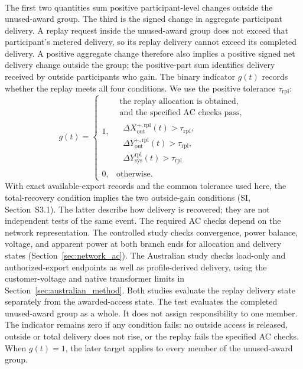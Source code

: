 \documentclass[twoside,twocolumn,9pt]{article}
\begin{document}
{\begin{align}
\label{eq:feeder_delivery_recovery}
\end{align}
The first two quantities sum positive participant-level changes outside the
unused-award group. The third is the signed change in aggregate participant
delivery. A replay request inside the unused-award group does not exceed that
participant's metered delivery, so its replay delivery cannot exceed its
completed delivery. A positive aggregate change therefore also implies a
positive signed net delivery change outside the group; the positive-part sum
identifies delivery received by outside participants who gain.
The binary indicator $g(t)$ records whether the replay meets all four
conditions. We use the positive tolerance $\tau_{\mathrm{rpl}}$:
\begin{equation}
g(t)=
\begin{cases}
1,&\begin{array}{l}
\text{the replay allocation is obtained,}\\[-0.5mm]
\text{and the specified AC checks pass,}\\[-0.5mm]
\begin{gathered}
\Delta X_{\mathrm{out}}^{+,\mathrm{rpl}}(t)>\tau_{\mathrm{rpl}},\\[-0.5mm]
\Delta Y_{\mathrm{out}}^{+,\mathrm{rpl}}(t)>\tau_{\mathrm{rpl}},\\[-0.5mm]
\Delta Y_{\mathrm{sys}}^{\mathrm{rpl}}(t)>\tau_{\mathrm{rpl}}
\end{gathered}
\end{array}\\[2mm]
0,&\text{otherwise}.
\end{cases}
\label{eq:replay_condition_indicator}
\end{equation}
With exact available-export records and the common tolerance used here, the
total-recovery condition implies the two outside-gain conditions (SI,
Section~S3.1). The latter describe how delivery is recovered; they are not
independent tests of the same event.
The required AC checks depend on the network representation. The controlled
study checks convergence, power balance, voltage, and apparent power at both
branch ends for allocation and delivery states
(Section~\ref{sec:network_ac}). The Australian study checks load-only and
authorized-export endpoints as well as profile-derived delivery, using the
customer-voltage and native transformer limits in
Section~\ref{sec:australian_method}. Both studies evaluate the replay delivery
state separately from the awarded-access state.
The test evaluates the completed unused-award group as a whole. It does not assign
responsibility to one member. The indicator remains zero if any condition fails:
no outside access is released, outside or total delivery does not rise, or the
replay fails the specified AC checks. When $g(t)=1$, the later target applies to
every member of the unused-award group.

}
\end{document}
